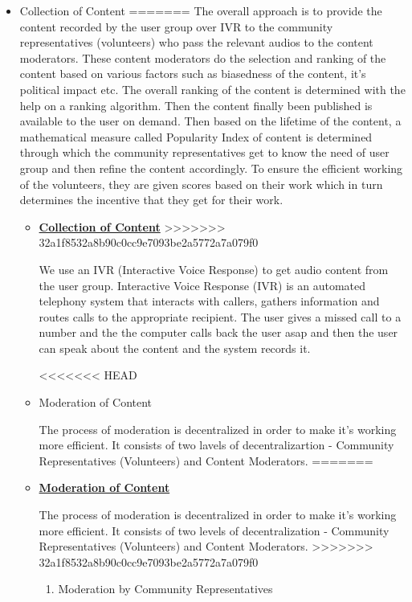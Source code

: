 \documentclass[11pt]{article}
\begin{document}
        \begin{itemize}
			\item Collection of Content
=======
    The overall approach is to provide the content recorded by the user group over IVR to the community representatives (volunteers) who pass the relevant audios to the content moderators. These content moderators do the selection and ranking of the content based on various factors such as biasedness of the content, it's political impact etc. The overall ranking of the content is determined with the help on a ranking algorithm. Then the content finally been published is available to the user on demand. Then based on the lifetime of the content, a mathematical measure called Popularity Index of content is determined through which the community representatives get to know the need of user group and then refine the content accordingly. To ensure the efficient working of the volunteers, they are given scores based on their work which in turn determines the incentive that they get for their work.

        \begin{itemize}
			\item \textbf{\underline{Collection of Content}}
>>>>>>> 32a1f8532a8b90c0cc9e7093be2a5772a7a079f0


			We use an IVR (Interactive Voice Response) to get audio content from the user group. Interactive Voice Response (IVR) is an automated telephony system that interacts with callers, gathers information and routes calls to the appropriate recipient. The user gives a missed call to a number and the the computer calls back the user asap and then the user can speak about the content and the system records it.


<<<<<<< HEAD
			\item Moderation of Content


			The process of moderation is decentralized in order to make it's working more efficient. It consists of two lavels of decentralizartion - Community Representatives (Volunteers) and Content Moderators.
=======
			\item \textbf{\underline{Moderation of Content}}


			The process of moderation is decentralized in order to make it's working more efficient. It consists of two levels of decentralization - Community Representatives (Volunteers) and Content Moderators.
>>>>>>> 32a1f8532a8b90c0cc9e7093be2a5772a7a079f0


			\begin{enumerate}
				\item Moderation by Community Representatives



\end{enumerate}
\end{itemize}
\end{itemize}
\end{document}
